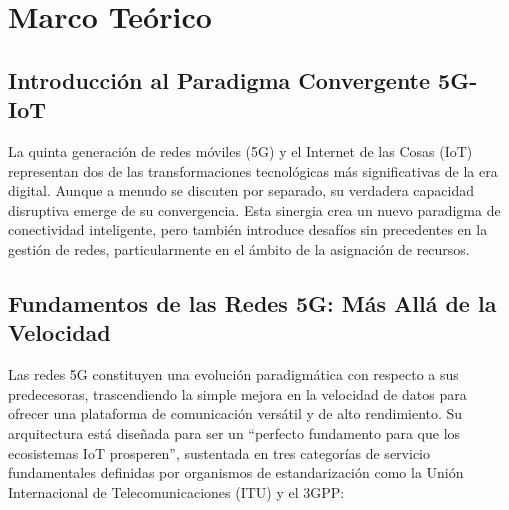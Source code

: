\documentclass[12pt,a4paper]{article}
\begin{document}
\newpage

\newpage

\section{Marco Teórico} \label{sec:marco_teorico}

\subsection{Introducción al Paradigma Convergente 5G-IoT}

La quinta generación de redes móviles (5G) y el Internet de las Cosas (IoT) representan dos de las transformaciones tecnológicas más significativas de la era digital. Aunque a menudo se discuten por separado, su verdadera capacidad disruptiva emerge de su convergencia. Esta sinergia crea un nuevo paradigma de conectividad inteligente, pero también introduce desafíos sin precedentes en la gestión de redes, particularmente en el ámbito de la asignación de recursos.

\subsection{Fundamentos de las Redes 5G: Más Allá de la Velocidad}

Las redes 5G constituyen una evolución paradigmática con respecto a sus predecesoras, trascendiendo la simple mejora en la velocidad de datos para ofrecer una plataforma de comunicación versátil y de alto rendimiento\cite{ref1}. Su arquitectura está diseñada para ser un ``perfecto fundamento para que los ecosistemas IoT prosperen''\cite{ref4}, sustentada en tres categorías de servicio fundamentales definidas por organismos de estandarización como la Unión Internacional de Telecomunicaciones (ITU) y el 3GPP\cite{ref5}:
\end{document}
